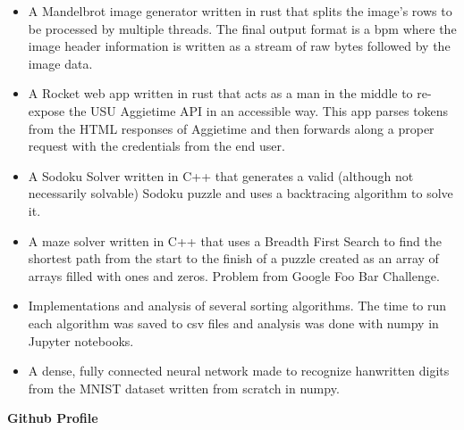 \begin{itemize}
	\item A Mandelbrot image generator written in rust that splits the 
		image's rows to be processed by multiple threads. The final output format 
		is a bpm where the image header information is written as a stream of raw 
		bytes followed by the image data.
\end{itemize}
\smallskip
\smallskip
{}
\begin{itemize}
	\item A Rocket web app written in rust that acts as a man in the middle to
		re-expose the USU Aggietime API in an accessible way. This app parses
		tokens from the HTML responses of Aggietime and then forwards along a
		proper request with the credentials from the end user.
\end{itemize}
\smallskip
\smallskip
{}
\begin{itemize}
	\item A Sodoku Solver written in C++ that generates a valid (although not
		necessarily solvable) Sodoku puzzle and uses a backtracing algorithm to
		solve it. 
\end{itemize}
\smallskip
\smallskip
{}
\begin{itemize}
	\item A maze solver written in C++ that uses a Breadth First Search to find 
		the shortest path from the start to the finish of a puzzle created as an 
		array of arrays filled with ones and zeros. Problem from Google Foo Bar
		Challenge.
\end{itemize}
\smallskip
\smallskip
{}
\begin{itemize}
	\item Implementations and analysis of several sorting algorithms. The time
		to run each algorithm was saved to csv files and analysis was done with
		numpy in Jupyter notebooks.
\end{itemize}
\smallskip
\smallskip
{}
\begin{itemize}
	\item A dense, fully connected neural network made to recognize hanwritten
		digits from the MNIST dataset written from scratch in numpy.
\end{itemize}
\medskip
\raggedleft\textbf{Github Profile} \\
\smallskip
\raggedleft{}
